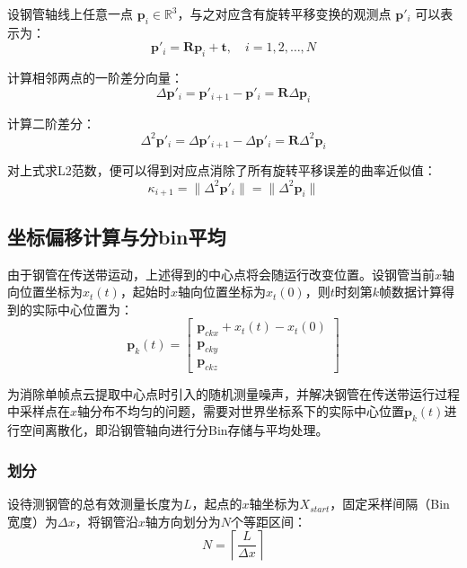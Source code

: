 \documentclass{article}
\begin{document}
设钢管轴线上任意一点 $\mathbf{p}_i \in \mathbb{R}^3$，与之对应含有旋转平移变换的观测点 $\mathbf{p}'_i$ 可以表示为：
\begin{equation}
    \mathbf{p}'_i = \mathbf{R} \mathbf{p}_i + \mathbf{t}, \quad i = 1,2,\dots,N
\end{equation}

计算相邻两点的一阶差分向量：
\begin{equation}
    \Delta \mathbf{p}'_i = \mathbf{p}'_{i+1} - \mathbf{p}'_i = \mathbf{R} \Delta \mathbf{p}_i
\end{equation}

计算二阶差分：
\begin{equation}
    \Delta^2 \mathbf{p}'_i = \Delta \mathbf{p}'_{i+1} - \Delta \mathbf{p}'_i = \mathbf{R} \Delta^2 \mathbf{p}_i
\end{equation}

对上式求L2范数，便可以得到对应点消除了所有旋转平移误差的曲率近似值：
\begin{equation}
    \kappa_{i+1} = \|\Delta^2 \mathbf{p}'_i\| = \|\Delta^2 \mathbf{p}_i\|
\end{equation}

\subsection{坐标偏移计算与分bin平均}

由于钢管在传送带运动，上述得到的中心点将会随运行改变位置。设钢管当前$x$轴向位置坐标为$x_{t}(t)$，起始时$x$轴向位置坐标为$x_{t}(0)$，则$t$时刻第$k$帧数据计算得到的实际中心位置为：
\begin{equation}
    \mathbf{p}_k(t) =
    \begin{bmatrix}
    \mathbf{p}_{ckx} + x_t(t) - x_t(0) \\
    \mathbf{p}_{cky} \\
    \mathbf{p}_{ckz}
    \end{bmatrix}
\end{equation}

为消除单帧点云提取中心点时引入的随机测量噪声，并解决钢管在传送带运行过程中采样点在$x$轴分布不均匀的问题，需要对世界坐标系下的实际中心位置$\mathbf{p}_k(t)$进行空间离散化，即沿钢管轴向进行分Bin存储与平均处理。

\subsubsection{划分}

设待测钢管的总有效测量长度为$L$，起点的$x$轴坐标为$X_{start}$，固定采样间隔（Bin宽度）为$\Delta x$，将钢管沿$x$轴方向划分为$N$个等距区间：
\begin{equation}
    N = \left\lceil \frac{L}{\Delta x} \right\rceil
\end{equation}
\end{document}
